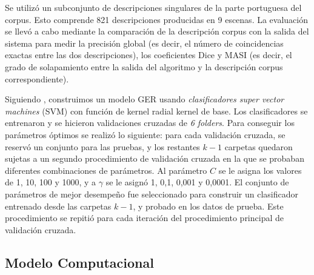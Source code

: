 Se utiliz\'o un subconjunto de descripciones singulares de la parte portuguesa del corpus. Esto comprende 821 descripciones producidas en 9 escenas. La evaluaci\'on se llev\'o a cabo mediante la comparaci\'on de la descripci\'on corpus con la salida del sistema para medir la precisi\'on global (es decir, el n\'umero de coincidencias exactas entre las dos descripciones), los coeficientes Dice \cite{dice} y MASI \cite{masi} (es decir, el grado de solapamiento entre la salida del algoritmo y la descripci\'on corpus correspondiente).

Siguiendo \cite{thiago-svm}, construimos un modelo GER usando {\it clasificadores super vector machines} (SVM) con funci\'on de kernel radial kernel de base. Los clasificadores se entrenaron y se hicieron validaciones cruzadas de {\it 6 folders}. Para conseguir los par\'ametros \'optimos se realiz\'o lo siguiente: para cada validaci\'on cruzada, se reserv\'o un conjunto para las pruebas, y los restantes $k-1$ carpetas quedaron sujetas a un segundo procedimiento de validaci\'on cruzada en la que se probaban diferentes combinaciones de par\'ametros. Al par\'ametro $C$ se le asigna los valores de 1, 10, 100 y 1000, y a $\gamma$ se le asign\'o 1, 0,1, 0,001 y 0,0001. El conjunto de par\'ametros de mejor desempe\~no fue seleccionado para construir un clasificador entrenado desde las carpetas $k-1$, y probado en los datos de prueba. Este procedimiento se repiti\'o para cada iteraci\'on del procedimiento principal de validaci\'on cruzada.
\subsection{Modelo Computacional }



